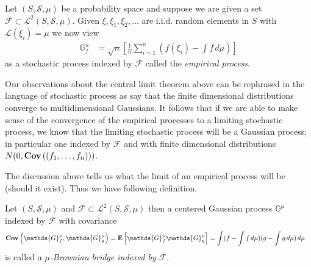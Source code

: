 \begin{defn}
Let $(S, \mathcal{S}, \mu)$ be a probability space  and suppose we are given a set $\mathcal{F} \subset \mathcal{L}^2(S, \mathcal{S}, \mu)$.  Given $\xi, \xi_1, \xi_2, \dotsc$ are i.i.d. random elements in $S$ with $\mathcal{L}(\xi_i) = \mu$ we now view 
\begin{align*}
\mathds{G}^n_f &= \sqrt{n} \left [ \frac{1}{n} \sum_{i=1}^n \left( f(\xi_i) - \int f \, d\mu \right) \right ]
\end{align*}
as a stochastic process indexed by $\mathcal{F}$ called the \emph{empirical process}.
\end{defn} 
Our observations about the central limit theorem above can be rephrased in the language of stochastic process as say that the finite dimensional distributions converge to multidimensional Gaussians.  It follows that if we are able to make sense of the convergence of the empirical processes to a limiting stochastic process, we know that the limiting stochastic process will be a Gaussian process; in particular one indexed by $\mathcal{F}$ and with finite dimensional distributions $N(0, \textbf{Cov} \left ((f_1, \dotsc, f_n) \right ))$.  

The discussion above tells us what the limit of an empirical process will be (should it exist).  Thus we have following definition.
\begin{defn}Let $(S, \mathcal{S}, \mu)$ and $\mathcal{F} \subset \mathcal{L}^2(S, \mathcal{S}, \mu)$ then a centered Gaussian process $\mathds{G}^\mu$ indexed by $\mathcal{F}$ with covariance 
\begin{align*}
\scovariance{\mathds{G}^\mu_f}{\mathds{G}^\mu_g} &= \expectation{\mathds{G}^\mu_f \mathds{G}^\mu_g} = \int (f - \int f \, d\mu)(g - \int g \, d\mu) \, d\mu
\end{align*}
is called a \emph{$\mu$-Brownian bridge indexed by $\mathcal{F}$}.
\end{defn}


